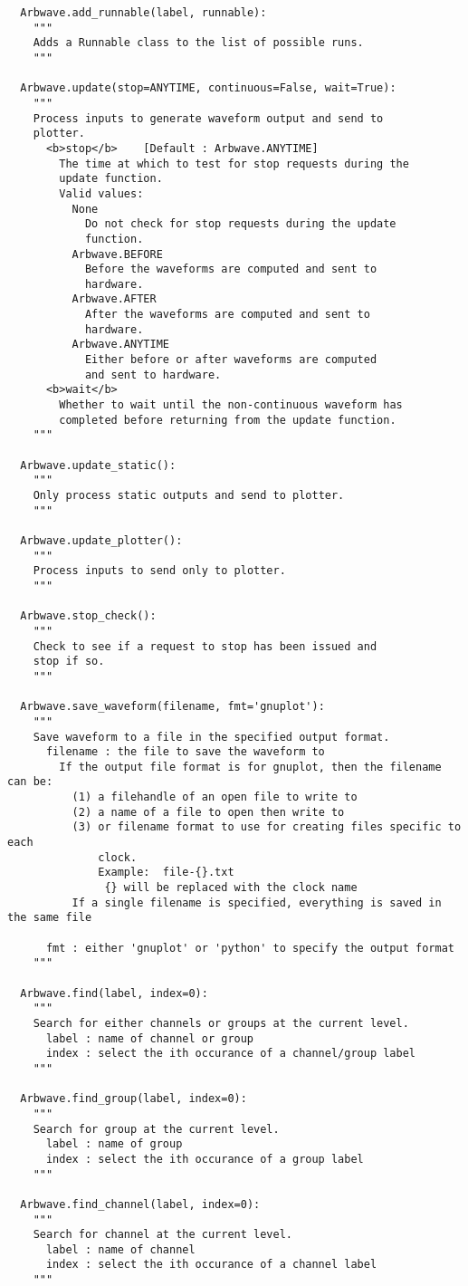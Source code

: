 \begin{lstlisting}
  Arbwave.add_runnable(label, runnable):
    """
    Adds a Runnable class to the list of possible runs.
    """

  Arbwave.update(stop=ANYTIME, continuous=False, wait=True):
    """
    Process inputs to generate waveform output and send to
    plotter.
      <b>stop</b>    [Default : Arbwave.ANYTIME]
        The time at which to test for stop requests during the
        update function.
        Valid values:
          None
            Do not check for stop requests during the update
            function.
          Arbwave.BEFORE
            Before the waveforms are computed and sent to
            hardware.
          Arbwave.AFTER
            After the waveforms are computed and sent to
            hardware.
          Arbwave.ANYTIME
            Either before or after waveforms are computed
            and sent to hardware.
      <b>wait</b>
        Whether to wait until the non-continuous waveform has
        completed before returning from the update function.
    """

  Arbwave.update_static():
    """
    Only process static outputs and send to plotter.
    """

  Arbwave.update_plotter():
    """
    Process inputs to send only to plotter.
    """

  Arbwave.stop_check():
    """
    Check to see if a request to stop has been issued and
    stop if so.
    """

  Arbwave.save_waveform(filename, fmt='gnuplot'):
    """
    Save waveform to a file in the specified output format.
      filename : the file to save the waveform to
        If the output file format is for gnuplot, then the filename can be:
          (1) a filehandle of an open file to write to
          (2) a name of a file to open then write to
          (3) or filename format to use for creating files specific to each
              clock.
              Example:  file-{}.txt
               {} will be replaced with the clock name
          If a single filename is specified, everything is saved in the same file

      fmt : either 'gnuplot' or 'python' to specify the output format
    """

  Arbwave.find(label, index=0):
    """
    Search for either channels or groups at the current level.
      label : name of channel or group
      index : select the ith occurance of a channel/group label
    """

  Arbwave.find_group(label, index=0):
    """
    Search for group at the current level.
      label : name of group
      index : select the ith occurance of a group label
    """

  Arbwave.find_channel(label, index=0):
    """
    Search for channel at the current level.
      label : name of channel
      index : select the ith occurance of a channel label
    """
\end{lstlisting}

